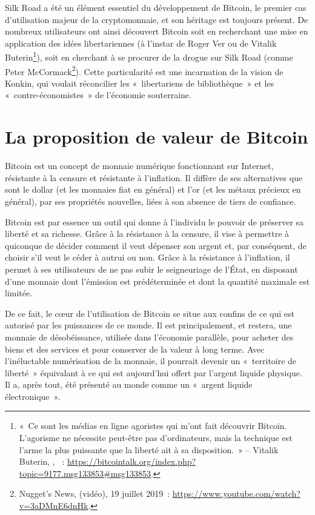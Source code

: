 \clearpage
Silk Road a été un élément essentiel du développement de Bitcoin, le premier cas d'utilisation majeur de la cryptomonnaie, et son héritage est toujours présent. De nombreux utilisateurs ont ainsi découvert Bitcoin soit en recherchant une mise en application des idées libertariennes (à l'instar de Roger Ver ou de Vitalik Buterin\footnote{«~Ce sont les médias en ligne agoristes qui m'ont fait découvrir Bitcoin. L'agorisme ne nécessite peut-être pas d'ordinateurs, mais la technique est l'arme la plus puissante que la liberté ait à sa disposition.~» -- Vitalik Buterin, , ~: \url{https://bitcointalk.org/index.php?topic=9177.msg133853\#msg133853}.}), soit en cherchant à se procurer de la drogue sur Silk Road (comme Peter McCormack\footnote{Nugget's News,  (vidéo), 19 juillet 2019~: \url{https://www.youtube.com/watch?v=3aDMnE6dnHk}.}). Cette particularité est une incarnation de la vision de Konkin, qui voulait réconcilier les «~libertariens de bibliothèque~» et les «~contre-économistes~» de l'économie souterraine.

\section*{La proposition de valeur de Bitcoin}

Bitcoin est un concept de monnaie numérique fonctionnant sur Internet, résistante à la censure et résistante à l'inflation. Il diffère de ses alternatives que sont le dollar (et les monnaies fiat en général) et l'or (et les métaux précieux en général), par ses propriétés nouvelles, liées à son absence de tiers de confiance. 

Bitcoin est par essence un outil qui donne à l'individu le pouvoir de préserver sa liberté et sa richesse. Grâce à la résistance à la censure, il vise à permettre à quiconque de décider comment il veut dépenser son argent et, par conséquent, de choisir s'il veut le céder à autrui ou non. Grâce à la résistance à l'inflation, il permet à ses utilisateurs de ne pas subir le seigneuriage de l'État, en disposant d'une monnaie dont l'émission est prédéterminée et dont la quantité maximale est limitée.

De ce fait, le cœur de l'utilisation de Bitcoin se situe aux confins de ce qui est autorisé par les puissances de ce monde. Il est principalement, et restera, une monnaie de désobéissance, utilisée dans l'économie parallèle, pour acheter des biens et des services et pour conserver de la valeur à long terme. Avec l'inéluctable numérisation de la monnaie, il pourrait devenir un «~territoire de liberté~» équivalant à ce qui est aujourd'hui offert par l'argent liquide physique. Il a, après tout, été présenté au monde comme un «~argent liquide électronique~».
